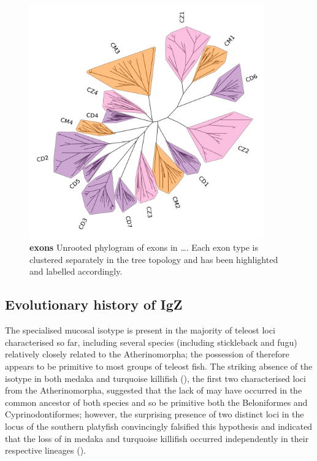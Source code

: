  \begin{figure}
	\centering
	\includegraphics[width=0.9\textwidth]{_Figures/png/cyprinodontiform-ch-tree}
	\caption[ in the Atherinomorpha has been lost multiple times independently]{\textbf{\ch exons } Unrooted phylogram of \ch exons in \dots. %
	Each exon type is clustered separately in the tree topology and has been highlighted and labelled accordingly.}
	\label{fig:cyprinodontiform-ch-tree}
\end{figure} %


	\subsection{Evolutionary history of IgZ} %
	
	The specialised mucosal isotype  is present in the majority of teleost \igh{} loci characterised so far, including several species (including stickleback and fugu) relatively closely related to the Atherinomorpha; the possession of  therefore appears to be primitive to most groups of teleost fish. The striking absence of the isotype in both medaka and turquoise killifish (), the first two characterised \igh{} loci from the Atherinomorpha, suggested that the lack of  may have occurred in the common ancestor of both species and so be primitive both the Beloniformes and Cyprinodontiformes; however, the surprising presence of two distinct  loci in the locus of the southern platyfish \xma convincingly falsified this hypothesis and indicated that the loss of  in medaka and turquoise killifish occurred independently in their respective lineages (). 
	
